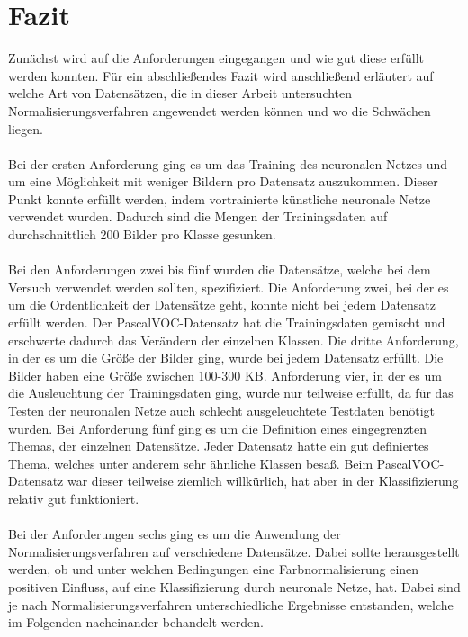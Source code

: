 \chapter{Fazit}\label{s.fazit}
Zunächst wird auf die Anforderungen eingegangen und wie gut diese erfüllt werden konnten. Für ein abschließendes Fazit wird anschließend erläutert auf welche Art von Datensätzen, die in dieser Arbeit untersuchten Normalisierungsverfahren angewendet werden können und wo die Schwächen liegen.\\\\
Bei der ersten Anforderung ging es um das Training des neuronalen Netzes und um eine Möglichkeit mit weniger Bildern pro Datensatz auszukommen. Dieser Punkt konnte erfüllt werden, indem vortrainierte künstliche neuronale Netze verwendet wurden. Dadurch sind die Mengen der Trainingsdaten auf durchschnittlich 200 Bilder pro Klasse gesunken.\\\\
Bei den Anforderungen zwei bis fünf wurden die Datensätze, welche bei dem Versuch verwendet werden sollten, spezifiziert. Die Anforderung zwei, bei der es um die Ordentlichkeit der Datensätze geht, konnte nicht bei jedem Datensatz erfüllt werden. Der PascalVOC-Datensatz hat die Trainingsdaten gemischt und erschwerte dadurch das Verändern der einzelnen Klassen. Die dritte Anforderung, in der es um die Größe der Bilder ging, wurde bei jedem Datensatz erfüllt. Die Bilder haben eine Größe zwischen 100-300 KB. Anforderung vier, in der es um die Ausleuchtung der Trainingsdaten ging, wurde nur teilweise erfüllt, da für das Testen der neuronalen Netze auch schlecht ausgeleuchtete Testdaten benötigt wurden. Bei Anforderung fünf ging es um die Definition eines eingegrenzten Themas, der einzelnen Datensätze. Jeder Datensatz hatte ein gut definiertes Thema, welches unter anderem sehr ähnliche Klassen besaß. Beim PascalVOC-Datensatz war dieser teilweise ziemlich willkürlich, hat aber in der Klassifizierung relativ gut funktioniert.\\\\
Bei der Anforderungen sechs ging es um die Anwendung der Normalisierungsverfahren auf verschiedene Datensätze. Dabei sollte herausgestellt werden, ob und unter welchen Bedingungen eine Farbnormalisierung einen positiven Einfluss, auf eine Klassifizierung durch neuronale Netze, hat. Dabei sind je nach Normalisierungsverfahren unterschiedliche Ergebnisse entstanden, welche im Folgenden nacheinander behandelt werden.\\\\
